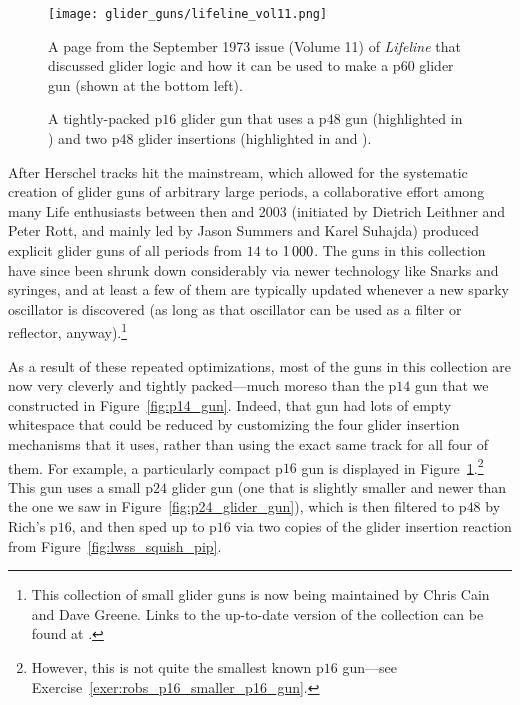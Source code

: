 \begin{figure}[!htb]
	\centering
	\begin{minipage}[b]{0.46\textwidth}
		\centering
		\texttt{[image: glider\_guns/lifeline\_vol11.png]}
		\caption{A page from the September 1973 issue (Volume 11) of \emph{Lifeline} that discussed glider logic and how it can be used to make a p$60$ glider gun (shown at the bottom left).}\label{fig:lifeline_v11}
	\end{minipage}\hfill
	\begin{minipage}[b]{0.5\textwidth}
		\centering
		\caption{A tightly-packed p$16$ glider gun that uses a p$48$ gun (highlighted in ) and two p$48$ glider insertions (highlighted in  and ).}\label{fig:p16_gun}
	\end{minipage}
\end{figure}

After Herschel tracks hit the mainstream, which allowed for the systematic creation of glider guns of arbitrary large periods, a collaborative effort among many Life enthusiasts between then and 2003 (initiated by Dietrich Leithner and Peter Rott, and mainly led by Jason Summers and Karel Suhajda) produced explicit glider guns of all periods from $14$ to $1{\,}000$. The guns in this collection have since been shrunk down considerably via newer technology like Snarks and syringes, and at least a few of them are typically updated whenever a new sparky oscillator is discovered (as long as that oscillator can be used as a filter or reflector, anyway).\footnote{This collection of small glider guns is now being maintained by Chris Cain and Dave Greene. Links to the up-to-date version of the collection can be found at .}

As a result of these repeated optimizations, most of the guns in this collection are now very cleverly and tightly packed---much moreso than the p$14$ gun that we constructed in Figure~\ref{fig:p14_gun}. Indeed, that gun had lots of empty whitespace that could be reduced by customizing the four glider insertion mechanisms that it uses, rather than using the exact same track for all four of them. For example, a particularly compact p$16$ gun is displayed in Figure~\ref{fig:p16_gun}.\footnote{However, this is not quite the smallest known p$16$ gun---see Exercise~\ref{exer:robs_p16_smaller_p16_gun}.} This gun uses a small p$24$ glider gun (one that is slightly smaller and newer than the one we saw in Figure~\ref{fig:p24_glider_gun}), which is then filtered to p$48$ by Rich's p$16$, and then sped up to p$16$ via two copies of the glider insertion reaction from Figure~\ref{fig:lwss_squish_pip}.

